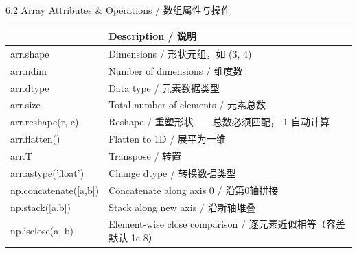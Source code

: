 \documentclass[11pt,a4paper]{report}
\begin{document}
\begin{cmdsection}{6.2  Array Attributes \& Operations / 数组属性与操作}
\normalsize\renewcommand{\arraystretch}{1.4}
\centering
\begin{tabularx}{\textwidth}{@{}>{\ttfamily}l>{\raggedright\arraybackslash}X@{}}
\toprule
\multicolumn{1}{@{}l}{\textbf{Syntax}} & \textbf{Description / 说明} \\ \midrule
arr.shape                   & Dimensions / 形状元组，如 (3, 4) \\
arr.ndim                    & Number of dimensions / 维度数 \\
arr.dtype                   & Data type / 元素数据类型 \\
arr.size                    & Total number of elements / 元素总数 \\
arr.reshape(r, c)           & Reshape / 重塑形状——总数必须匹配，-1 自动计算 \\
arr.flatten()               & Flatten to 1D / 展平为一维 \\
arr.T                       & Transpose / 转置 \\
arr.astype('float')         & Change dtype / 转换数据类型 \\
np.concatenate([a,b])       & Concatenate along axis 0 / 沿第0轴拼接 \\
np.stack([a,b])             & Stack along new axis / 沿新轴堆叠 \\
np.isclose(a, b)            & Element-wise close comparison / 逐元素近似相等（容差默认 1e-8） \\
\bottomrule
\end{tabularx}
\end{cmdsection}
\end{document}
